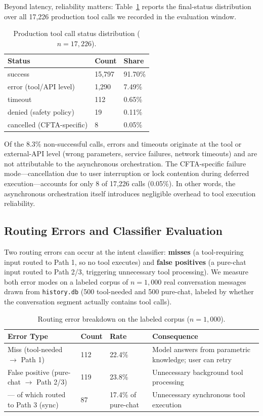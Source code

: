 \documentclass[numbered,mediumone,traditional]{oup-authoring-template}
\begin{document}
Beyond latency, reliability matters: Table~\ref{tab:status} reports the final-status distribution over all 17,226 production tool calls we recorded in the evaluation window.

\begin{table}[htbp]
\caption{Production tool call status distribution ($n = 17{,}226$).}
\label{tab:status}
\centering
\small
\begin{tabular}{@{}lll@{}}
\toprule
Status & Count & Share \\
\midrule
success & 15,797 & 91.70\% \\
error (tool/API level) & 1,290 & 7.49\% \\
timeout & 112 & 0.65\% \\
denied (safety policy) & 19 & 0.11\% \\
cancelled (CFTA-specific) & 8 & 0.05\% \\
\bottomrule
\end{tabular}
\end{table}

Of the 8.3\% non-successful calls, errors and timeouts originate at the tool or external-API level (wrong parameters, service failures, network timeouts) and are not attributable to the asynchronous orchestration. The CFTA-specific failure mode---cancellation due to user interruption or lock contention during deferred execution---accounts for only 8 of 17,226 calls (0.05\%). In other words, the asynchronous orchestration itself introduces negligible overhead to tool execution reliability.

\subsection{Routing Errors and Classifier Evaluation}

Two routing errors can occur at the intent classifier: \textbf{misses} (a tool-requiring input routed to Path 1, so no tool executes) and \textbf{false positives} (a pure-chat input routed to Path 2/3, triggering unnecessary tool processing). We measure both error modes on a labeled corpus of $n = 1{,}000$ real conversation messages drawn from \texttt{history.db} (500 tool-needed and 500 pure-chat, labeled by whether the conversation segment actually contains tool calls).

\begin{table}[htbp]
\caption{Routing error breakdown on the labeled corpus ($n = 1{,}000$).}
\label{tab:routing}
\centering
\footnotesize
\begin{tabular}{@{}p{}llp{}@{}}
\toprule
Error Type & Count & Rate & Consequence \\
\midrule
Miss (tool-needed $\rightarrow$ Path 1) & 112 & 22.4\% & Model answers from parametric knowledge; user can retry \\
False positive (pure-chat $\rightarrow$ Path 2/3) & 119 & 23.8\% & Unnecessary background tool processing \\
--- of which routed to Path 3 (sync) & 87 & 17.4\% of pure-chat & Unnecessary synchronous tool execution \\
\bottomrule
\end{tabular}
\end{table}
\end{document}

